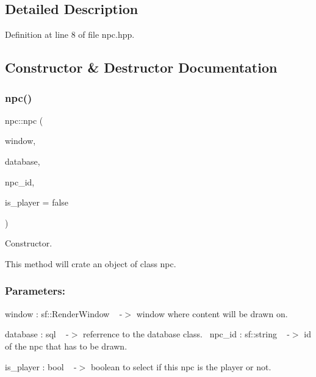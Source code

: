 \subsection{Detailed Description}


Definition at line 8 of file npc.\+hpp.



\subsection{Constructor \& Destructor Documentation}
\mbox{\label{classnpc_ac99eae829579a6f49387bd44129ec33a}} 
\subsubsection{\texorpdfstring{npc()}{npc()}}
{\footnotesize\ttfamily npc\+::npc (\begin{DoxyParamCaption}\item[{sf\+::\+Render\+Window \&}]{window,  }\item[{\hyperlink{classsql}{sql} \&}]{database,  }\item[{std\+::string}]{npc\+\_\+id,  }\item[{bool}]{is\+\_\+player = {\ttfamily false} }\end{DoxyParamCaption})}



Constructor. 

This method will crate an object of class npc.~\newline


\subsubsection*{Parameters\+: }

window \+: sf\+::\+Render\+Window ~\newline
-\/$>$ window where content will be drawn on.

database \+: sql ~\newline
-\/$>$ referrence to the database class.~\newline
 npc\+\_\+id \+: sf\+::string ~\newline
-\/$>$ id of the npc that has to be drawn.

is\+\_\+player \+: bool ~\newline
-\/$>$ boolean to select if this npc is the player or not.

